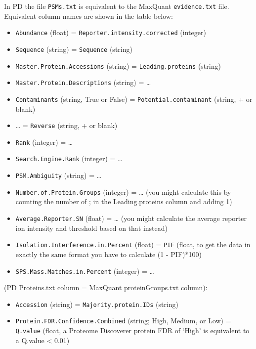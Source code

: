 \documentclass[9pt,a4paper,]{extarticle}
\begin{document}
In PD the file \texttt{PSMs.txt} is equivalent to the MaxQuant \texttt{evidence.txt} file.
Equivalent column names are shown in the table below:

\begin{itemize}
\item
  \texttt{Abundance} (float) = \texttt{Reporter.intensity.corrected} (integer)
\item
  \texttt{Sequence} (string) = \texttt{Sequence} (string)
\item
  \texttt{Master.Protein.Accessions} (string) = \texttt{Leading.proteins} (string)
\item
  \texttt{Master.Protein.Descriptions} (string) = \ldots{}
\item
  \texttt{Contaminants} (string, True or False) = \texttt{Potential.contaminant} (string, + or blank)
\item
  \ldots{} = \texttt{Reverse} (string, + or blank)
\item
  \texttt{Rank} (integer) = \ldots{}
\item
  \texttt{Search.Engine.Rank} (integer) = \ldots{}
\item
  \texttt{PSM.Ambiguity} (string) = \ldots{}
\item
  \texttt{Number.of.Protein.Groups} (integer) = \ldots{} (you might calculate this by counting the number of ; in the Leading.proteins column and adding 1)
\item
  \texttt{Average.Reporter.SN} (float) = \ldots{} (you might calculate the average reporter ion intensity and threshold based on that instead)
\item
  \texttt{Isolation.Interference.in.Percent} (float) = \texttt{PIF} (float, to get the data in exactly the same format you have to calculate (1 - PIF)*100)
\item
  \texttt{SPS.Mass.Matches.in.Percent} (integer) = \ldots{}
\end{itemize}

(PD Proteins.txt column = MaxQuant proteinGroups.txt column):

\begin{itemize}
\item
  \texttt{Accession} (string) = \texttt{Majority.protein.IDs} (string)
\item
  \texttt{Protein.FDR.Confidence.Combined} (string; High, Medium, or Low) = \texttt{Q.value} (float, a Proteome Discoverer protein FDR of `High' is equivalent to a Q.value \textless{} 0.01)
\end{itemize}

\renewcommand\refname{References}
{\small}
\end{document}
